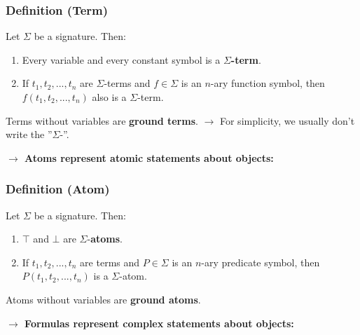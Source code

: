 \documentclass[conference]{styles/acmsiggraph}
\begin{document}
        \subsubsection{Definition (Term)}
            Let $\Sigma$ be a signature. Then:
            \begin{enumerate}
                \item Every variable and every constant symbol is a \textbf{$\Sigma$-term}.
                \item If $t_1,t_2,...,t_n$ are $\Sigma$-terms and $f \in \Sigma$ is an $n$-ary function symbol, then $f(t_1,t_2,...,t_n)$ also is a $\Sigma$-term.
            \end{enumerate}
            Terms without variables are \textbf{ground terms}.\newline
        $\rightarrow$ For simplicity, we usually don't write the ''$\Sigma$-''.\newline
        
        \textbf{$\rightarrow$ Atoms represent atomic statements about objects:}
        \subsubsection{Definition (Atom)}
            Let $\Sigma$ be a signature. Then:
            \begin{enumerate}
                \item $\top$ and $\bot$ are $\Sigma$-\textbf{atoms}.
                \item If $t_1,t_2,...,t_n$ are terms and $P \in \Sigma$ is an $n$-ary predicate symbol, then $P(t_1,t_2,...,t_n)$ is a $\Sigma$-atom.
            \end{enumerate}
            Atoms without variables are \textbf{ground atoms}.
        
        \textbf{$\rightarrow$ Formulas represent complex statements about objects:}
\end{document}
